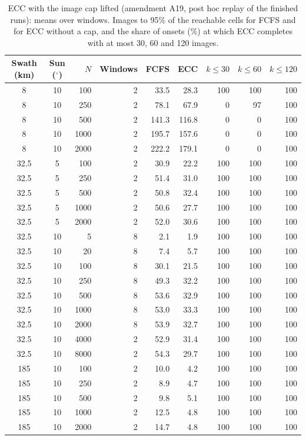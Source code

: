 \begin{table}[!t]
\centering
\footnotesize
\renewcommand{\arraystretch}{1.2}
\caption{ECC with the image cap lifted (amendment A19, post hoc replay of the finished runs): means over windows. Images to 95\% of the reachable cells for FCFS and for ECC without a cap, and the share of onsets (\%) at which ECC completes with at most 30, 60 and 120 images.}
\label{tab:a19replay}
\begin{tabular}{|c|c|r|r|r|r|r|r|r|}
\hline
Swath (km) & Sun ($^\circ$) & $N$ & Windows & FCFS & ECC & $k\leq30$ & $k\leq60$ & $k\leq120$ \\
\hline
8 & 10 & 100 & 2 & 33.5 & 28.3 & 100 & 100 & 100 \\
\hline
8 & 10 & 250 & 2 & 78.1 & 67.9 & 0 & 97 & 100 \\
\hline
8 & 10 & 500 & 2 & 141.3 & 116.8 & 0 & 0 & 100 \\
\hline
8 & 10 & 1000 & 2 & 195.7 & 157.6 & 0 & 0 & 100 \\
\hline
8 & 10 & 2000 & 2 & 222.2 & 179.1 & 0 & 0 & 100 \\
\hline
32.5 & 5 & 100 & 2 & 30.9 & 22.2 & 100 & 100 & 100 \\
\hline
32.5 & 5 & 250 & 2 & 51.4 & 31.0 & 100 & 100 & 100 \\
\hline
32.5 & 5 & 500 & 2 & 50.8 & 32.4 & 100 & 100 & 100 \\
\hline
32.5 & 5 & 1000 & 2 & 50.6 & 27.7 & 100 & 100 & 100 \\
\hline
32.5 & 5 & 2000 & 2 & 52.0 & 30.6 & 100 & 100 & 100 \\
\hline
32.5 & 10 & 5 & 8 & 2.1 & 1.9 & 100 & 100 & 100 \\
\hline
32.5 & 10 & 20 & 8 & 7.4 & 5.7 & 100 & 100 & 100 \\
\hline
32.5 & 10 & 100 & 8 & 30.1 & 21.5 & 100 & 100 & 100 \\
\hline
32.5 & 10 & 250 & 8 & 49.3 & 32.2 & 100 & 100 & 100 \\
\hline
32.5 & 10 & 500 & 8 & 53.6 & 32.9 & 100 & 100 & 100 \\
\hline
32.5 & 10 & 1000 & 8 & 53.0 & 33.3 & 100 & 100 & 100 \\
\hline
32.5 & 10 & 2000 & 8 & 53.9 & 32.7 & 100 & 100 & 100 \\
\hline
32.5 & 10 & 4000 & 2 & 52.9 & 31.4 & 100 & 100 & 100 \\
\hline
32.5 & 10 & 8000 & 2 & 54.3 & 29.7 & 100 & 100 & 100 \\
\hline
185 & 10 & 100 & 2 & 10.0 & 4.2 & 100 & 100 & 100 \\
\hline
185 & 10 & 250 & 2 & 8.9 & 4.7 & 100 & 100 & 100 \\
\hline
185 & 10 & 500 & 2 & 9.8 & 5.1 & 100 & 100 & 100 \\
\hline
185 & 10 & 1000 & 2 & 12.5 & 4.8 & 100 & 100 & 100 \\
\hline
185 & 10 & 2000 & 2 & 14.7 & 4.8 & 100 & 100 & 100 \\
\hline
\end{tabular}
\end{table}
